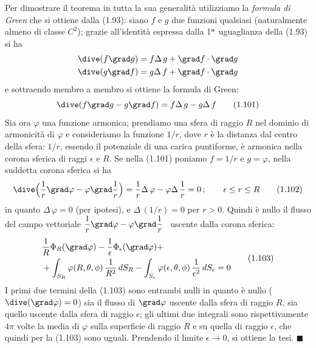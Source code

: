 Per dimostrare il teorema in tutta la sua generalità utilizziamo la \emph{formula di Green} che si ottiene dalla (1.93): siano $f$ e $g$ due funzioni qualsiasi (naturalmente almeno di classe $C^2$); grazie all'identità espressa dalla 1$^{\rm a}$ uguaglianza della (1.93) si ha
\[
\begin{aligned}
\dive(f\grad g)&=f\Delta\,g+\grad f\cdot\grad g\\
\dive(g\grad f)&=g\Delta\,f+\grad f\cdot\grad g
\end{aligned}
\]
e sottraendo membro a membro si ottiene la formula di Green:
\begin{equation}
\dive(f\grad g-g\grad f)=f\Delta\,g-g\Delta\,f
\tag{1.101}
\end{equation}
Sia ora $\varphi$ una funzione armonica; prendiamo una sfera di raggio $R$ nel dominio di armonicità di $\varphi$ e consideriamo la funzione $1/r$, dove $r$ è la distanza dal centro della sfera: $1/r$, essendo il potenziale di una carica puntiforme, è armonica nella corona sferica di raggi $\epsilon$ e $R$. Se nella (1.101) poniamo $f=1/r$ e $g=\varphi$, nella suddetta corona sferica si ha
\begin{equation}
\dive\Big(\frac1r\grad\varphi-\varphi\grad\frac1r\Big)=\frac1r\Delta\,\varphi-\varphi\Delta\,\frac1r=0\,;\qquad\epsilon\le r\le R
\tag{1.102}
\end{equation}
in quanto $\Delta\,\varphi=0$ (per ipotesi), e $\Delta\,(1/r)=0$ per $r>0$. Quindi è nullo il flusso del
campo vettoriale $\dfrac1r\grad\varphi-\varphi\grad\dfrac1r$ \ uscente dalla corona sferica:
\begin{equation}
\begin{split}
&\frac1R\Phi_R(\grad\varphi)-\frac1\epsilon\Phi_\epsilon(\grad\varphi)+\\
&+\int_{S_R}\varphi(R,\theta,\phi)\,\frac{1}{R^2}\,dS_R-\int_{S_\epsilon}\varphi(\epsilon,\theta,\phi)\,\frac{1}{\epsilon^2}\,dS_\epsilon=0
\end{split}
\tag{1.103}
\end{equation}
I primi due termini della (1.103) sono entrambi nulli in quanto è nullo \big($\dive(\grad\varphi)=0$\big) sia il flusso di $\grad\varphi$ uscente dalla sfera di raggio $R$, sia quello uscente dalla sfera di raggio $\epsilon$; gli ultimi due integrali sono rispettivamente $4\pi$ volte la media di $\varphi$ sulla superficie di raggio $R$ e su quella di raggio $\epsilon$, che quindi per la (1.103) sono uguali. Prendendo il limite $\epsilon\to0$, si ottiene la tesi. $\blacksquare$

